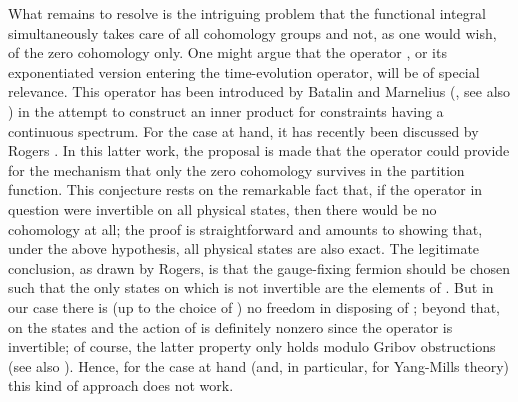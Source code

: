 \documentclass[a4paper,10pt]{article}
\begin{document}
What remains to resolve is the intriguing problem that the functional integral simultaneously takes care 
of all cohomology groups and not, as one would wish, of the zero 
cohomology only. One might argue that the operator \myHighlight{$[\hat{\Omega},\hat{\phi}]$}\coordHE{}, or its 
exponentiated version entering the time-evolution operator, will be of special relevance. 
This operator has been introduced by Batalin and Marnelius (\cite{Bata 95}, see also 
\cite{Marn 91}) in the attempt to construct an inner product for constraints having a 
continuous spectrum. For the case at hand, it has recently been discussed by Rogers 
\cite{Roge 97}. In this latter work, the proposal is made that the operator 
\myHighlight{$[\hat{\Omega},\hat{\phi}]$}\coordHE{} could provide for the mechanism that only the zero cohomology 
survives in the partition function. This conjecture rests on the remarkable fact that, if 
the operator in question were invertible on all physical states, then there would be no 
cohomology at all; the proof is straightforward and amounts to showing that, under the 
above hypothesis, all physical states are also exact. The legitimate conclusion, as drawn 
by Rogers, is that the gauge-fixing fermion should be chosen such that the only states on 
which \myHighlight{$[\hat{\Omega},\hat{\phi}]$}\coordHE{} is not invertible are the elements of \coordHE{}. 
But in our case there is (up to the choice of \myHighlight{$\chi$}\coordHE{}) no freedom in disposing of 
\myHighlight{$\hat{\phi}$}\coordHE{}; beyond that, on the states \coordHE{} and \coordHE{} the action of 
\myHighlight{$[\hat{\Omega},\hat{\phi}]$}\coordHE{} is definitely nonzero since the operator 
\myHighlight{$[\hat{\chi},\hat{\varphi}]$}\coordHE{} is invertible; of course, the latter property only holds 
modulo Gribov obstructions \cite{Grib 78,Sing 78} (see also \cite{Baul 96}). Hence, for 
the case at hand (and, in particular, for Yang-Mills theory) this kind of approach does 
not work.
\end{document}

